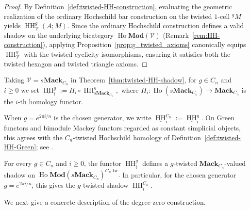 \documentclass[11pt,oneside]{amsart}
\DeclareMathOperator{\Ho}{Ho}
\DeclareMathOperator{\HH}{HH}
\numberwithin{equation}{section}
\numberwithin{figure}{section}
\theoremstyle{plain}
\theoremstyle{definition}
\theoremstyle{remark}
\begin{document}
\begin{proof}
By Definition~\ref{def:twisted-HH-construction}, evaluating the geometric realization of the ordinary Hochschild bar construction on the twisted $1$-cell ${}^gM$ yields $\HH_{\mathcal{V}}^g(A; M)$. Since the ordinary Hochschild construction defines a valid shadow on the underlying bicategory $\Ho\mathbf{Mod}(\mathcal{V})$ (Remark~\ref{rem:HH-construction}), 
applying Proposition~\ref{prop:g_twisted_axioms} canonically equips
\(\HH_{\mathcal V}^g\) with the twisted cyclicity isomorphisms, ensuring it satisfies both the twisted hexagon and twisted triangle axioms.
\end{proof}


Taking
\(
\mathcal V=s\mathbf{Mack}_{C_n}
\)
in Theorem~\ref{thm:twisted-HH-shadow}, for \(g\in C_n\) and
\(i\geq 0\) we set
\(
\underline{\HH}^{g}_i
:=
H_i\circ\HH^g_{s\mathbf{Mack}_{C_n}},
\)
where
\(
H_i\colon
\Ho(s\mathbf{Mack}_{C_n})
\to
\mathbf{Mack}_{C_n}
\)
is the \(i\)-th homology functor.

When \(g=e^{2\pi i/n}\) is the chosen generator, we write
\(
\underline{\HH}^{C_n}_i
:=
\underline{\HH}^{g}_i.
\)
On Green functors and bimodule Mackey functors regarded as constant
simplicial objects, this agrees with the \(C_n\)-twisted Hochschild
homology of Definition~\ref{def:twisted-HH-Green}; see
\cite[Definition~4.3.3]{AGHKK}.


\begin{cor}\label{cor:twisted-HH-Green}
For every \(g\in C_n\) and \(i\geq 0\), the functor
\(\underline{\HH}^{g}_i\) defines a \(g\)-twisted
\(\mathbf{Mack}_{C_n}\)-valued shadow on
\(\Ho\mathbf{Mod}(s\mathbf{Mack}_{C_n})^{C_n\text{-tw}}.
\)
In particular, for the chosen generator \(g=e^{2\pi i/n}\), this
gives the \(g\)-twisted shadow
\(\underline{\HH}^{C_n}_i\).
\end{cor}

 

We next give a concrete description of the degree-zero construction.
\end{document}
